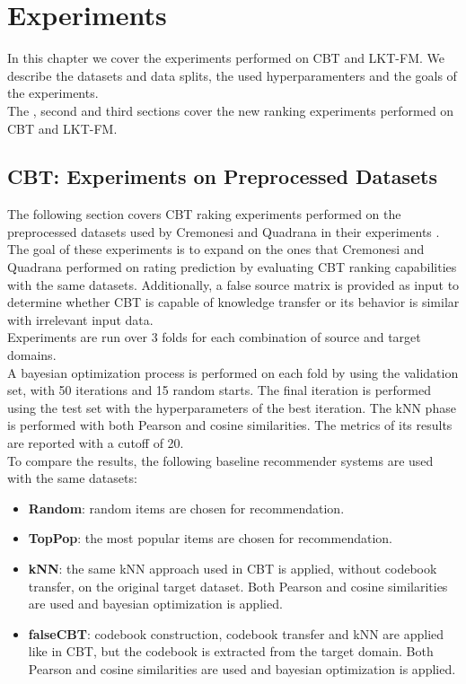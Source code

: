 \chapter{Experiments}
\label{ch:experiments}

In this chapter we cover the experiments performed on CBT and LKT-FM. We describe the datasets and data splits, the used hyperparamenters and the goals of the experiments.\\
The \cite{10.1145/2645710.2645769}, second and third sections cover the new ranking experiments performed on CBT and LKT-FM.



\section{CBT: Experiments on Preprocessed Datasets}

The following section covers CBT raking experiments performed on the preprocessed datasets used by Cremonesi and Quadrana in their experiments \cite{10.1145/2645710.2645769}. The goal of these experiments is to expand on the ones that Cremonesi and Quadrana performed on rating prediction by evaluating CBT ranking capabilities with the same datasets. Additionally, a false source matrix is provided as input to determine whether CBT is capable of knowledge transfer or its behavior is similar with irrelevant input data.\\
Experiments are run over 3 folds for each combination of source and target domains.\\
A bayesian optimization process is performed on each fold by using the validation set, with 50 iterations and 15 random starts. The final iteration is performed using the test set with the hyperparameters of the best iteration. The kNN phase is performed with both Pearson and cosine similarities. The metrics of its results are reported with a cutoff of 20.\\
To compare the results, the following baseline recommender systems are used with the same datasets:
\begin{itemize}
\item \textbf{Random}: random items are chosen for recommendation.
\item \textbf{TopPop}: the most popular items are chosen for recommendation.
\item \textbf{kNN}: the same kNN approach used in CBT is applied, without codebook transfer, on the original target dataset. Both Pearson and cosine similarities are used and bayesian optimization is applied.
\item \textbf{falseCBT}: codebook construction, codebook transfer and kNN are applied like in CBT, but the codebook is extracted from the target domain. Both Pearson and cosine similarities are used and bayesian optimization is applied.
\end{itemize}



